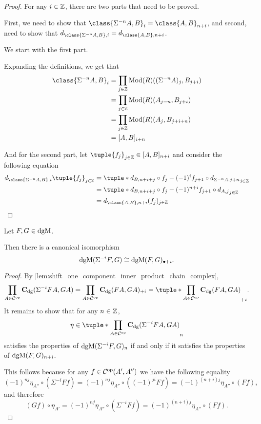 \begin{proof}
    For any \( i \in {\mathbb{Z}} \), there are two parts that need to be proved.

    First, we need to show that \( \class{\Sigma^{-n} A, B}_i = \class{A, B}_{n + i} \), and second, need to show that \( d_{\class{\Sigma^{-n} A, B}, i} = d_{\class{A, B}, n + i} \).

    We start with the first part.

    Expanding the definitions, we get that
    \begin{align*}
        \class{\Sigma^{-n} A, B}_i &= \prod_{j \in \Zb} \Mod(R)((\Sigma^{-n} A)_j, B_{j + i}) \\
        &= \prod_{j \in \Zb} \Mod(R)(A_{j - n}, B_{j + i}) \\
        &= \prod_{j \in \Zb} \Mod(R)(A_j, B_{j + i + n}) \\
        &= [A, B]_{i + n}
    \end{align*}

    And for the second part, let \( \tuple{f_j}_{j \in \Zb} \in [A, B]_{n + i} \) and consider the following equation
    \begin{align*}
        d_{\class{\Sigma^{-n} A, B}, i}\tuple{f_j}_{j \in \Zb} &= \tuple*{d_{B, n + i + j} \circ f_j - (-1)^i f_{j + 1} \circ d_{\Sigma^{-n} A, j + n}}_{j \in \Zb} \\
        &= \tuple*{d_{B, n + i + j} \circ f_j - (-1)^{n + i} f_{j + 1} \circ d_{A, j}}_{j \in \Zb} \\
        &= d_{\class{A, B}, n + i}(f_j)_{j \in \Zb}
    \end{align*}
\end{proof}

\begin{lemma}
    \label{lem:dgmod_shift_eq_plus}
    Let \( F, G \in \operatorname{dgM} \).

    Then there is a canonical isomorphism
    \[
        \operatorname{dgM}(\Sigma^{-i} F, G) \cong \operatorname{dgM}(F, G)_{\bullet + i}.
    \]
\end{lemma}
\begin{proof}
    By \autoref{lem:shift_one_component_inner_product_chain_complex},
    \[
        \prod_{A \in \Cc^{\op}} \C_{\dg}(\Sigma^{-i} F A, G A) = \prod_{A \in \Cc^{\op}} \C_{\dg}(F A, G A)_{+i} = \tuple*{\prod_{A \in \Cc^{\op}} \C_{\dg}(F A, G A)}_{+i}.
    \]
    It remains to show that for any \( n \in {\mathbb{Z}} \),
    \[
        \eta \in \tuple*{\prod_{A \in \Cc^{\op}} \C_{\dg}(\Sigma^{-i} F A, G A)}_n
    \]
    satisfies the properties of \( \operatorname{dgM}(\Sigma^{-i} F, G)_n \) if and only if it satisfies the properties of \( \operatorname{dgM}(F, G)_{n + i} \).

    This follows because for any \( f \in {\mathcal{C}}^{\operatorname{op}}(A', A'') \) we have the following equality
    \[
        (-1)^{nj} \eta_{A''} \circ (\Sigma^{-i} F f) = (-1)^{nj} \eta_{A''} \circ ((-1)^{ji}F f) = (-1)^{(n + i)j}\eta_{A''} \circ (F f),
    \]
    and therefore
    \[
        (G f) \circ \eta_{A'} = (-1)^{nj} \eta_{A''} \circ (\Sigma^{-i} F f) = (-1)^{(n + i)j}\eta_{A''} \circ (F f).
    \]
\end{proof}

